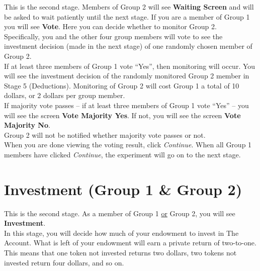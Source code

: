 \documentclass[12pt]{article}
\begin{document}
This is the second stage. Members of Group 2 will see {\bf Waiting Screen} and will be asked to wait patiently until the next stage. If you are a member of Group 1 you will see {\bf Vote}. Here you can decide whether to monitor Group 2.\\ 

Specifically, you and the other four group members will vote to see the investment decision (made in the next stage) of one randomly chosen member of Group 2.\\ 
 
If at least three members of Group 1 vote ``Yes'', then monitoring will occur.  You will see the investment decision of the randomly monitored Group 2 member in Stage 5 (Deductions).  Monitoring of Group 2 will cost Group 1 a total of 10 dollars, or 2 dollars per group member.\\ 
 
If majority vote passes -- if at least three members of Group 1 vote ``Yes'' -- you will see the screen {\bf Vote Majority Yes}.  If not, you will see the screen {\bf Vote Majority No}.\\ 

Group 2 will not be notified whether majority vote passes or not.\\ 

When you are done viewing the voting result, click {\em Continue}. When all Group 1 members have clicked {\em Continue}, the experiment will go on to the next stage.\\ 

\newpage

\fi






\section{Investment (Group 1 \& Group 2)}

This is the second stage. As a member of Group 1 \underline{or} Group 2, you will see {\bf Investment}.\\

In this stage, you will decide how much of your endowment to invest in The Account. What is left of your endowment will earn a private return of two-to-one. This means that one token not invested returns two dollars, two tokens not invested return four dollars, and so on.\\ 
\end{document}
